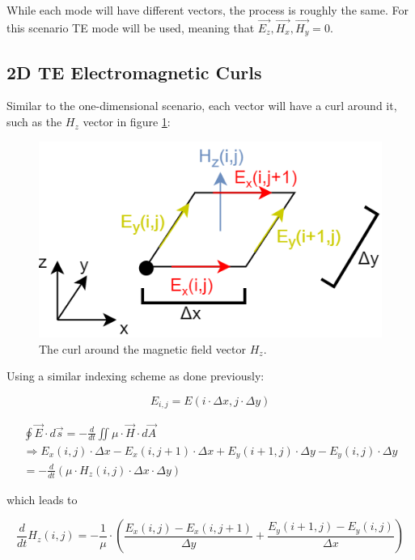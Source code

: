 While each mode will have different vectors, the process is roughly the same. For this scenario TE mode will be used, meaning that $\vec{E_z}, \vec{H_x}, \vec{H_y} = 0$.

\subsection{2D TE Electromagnetic Curls}

Similar to the one-dimensional scenario, each vector will have a curl around it, such as the $H_z$ vector in figure \ref{fig:fdtd2dHz}:

\begin{figure}[h!]
	\centering
	\includegraphics[scale=0.6]{Figures/fdtd2dHz}
	\decoRule
	\caption[2D TE Mode - $H_z$ vector curl]{The curl around the magnetic field vector $H_z$.}
	\label{fig:fdtd2dHz}
\end{figure}

Using a similar indexing scheme as done previously:

\begin{equation}
	\label{eqn:indexing2DElectric}
	E_{i,j} = E(i \cdot \Delta x , j \cdot \Delta y)
\end{equation}

\begin{multline}
	\label{eqn:2dHzCurl1}
	\oint \vec{E} \cdot d\vec{s} = - \frac{d}{dt} \iint \mu \cdot \vec{H} \cdot d\vec{A} \\
	\Rightarrow E_x(i,j) \cdot \Delta x - E_x(i,j+1) \cdot \Delta x + E_y(i+1,j) \cdot \Delta y - E_y(i,j) \cdot \Delta y \\ = -\frac{d}{dt}(\mu \cdot H_z(i,j) \cdot \Delta x \cdot \Delta y)
\end{multline}

which leads to

\begin{equation}
	\label{eqn:2dHzCurl2}
	\frac{d}{dt} H_z(i,j) = -\frac{1}{\mu} \cdot (\frac{E_x(i,j) - E_x(i,j+1)}{\Delta y} + \frac{E_y(i+1,j)- E_y(i,j)}{\Delta x})
\end{equation}

